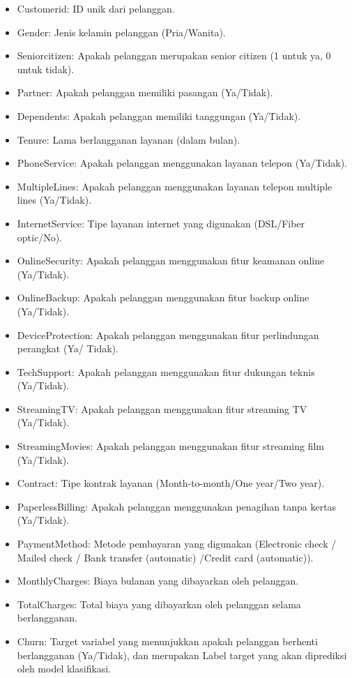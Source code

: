 \begin{itemize}
    \item Customerid: ID unik dari pelanggan.
    \item Gender: Jenis kelamin pelanggan (Pria/Wanita).
    \item Seniorcitizen: Apakah pelanggan merupakan senior citizen (1 untuk ya, 0 untuk tidak).
    \item Partner: Apakah pelanggan memiliki pasangan (Ya/Tidak).
    \item Dependents: Apakah pelanggan memiliki tanggungan (Ya/Tidak).
    \item Tenure: Lama berlangganan layanan (dalam bulan).
    \item PhoneService: Apakah pelanggan menggunakan layanan telepon (Ya/Tidak).
    \item MultipleLines: Apakah pelanggan menggunakan layanan telepon multiple lines (Ya/Tidak).
    \item InternetService: Tipe layanan internet yang digunakan (DSL/Fiber optic/No).
    \item OnlineSecurity: Apakah pelanggan menggunakan fitur keamanan online (Ya/Tidak).
    \item OnlineBackup: Apakah pelanggan menggunakan fitur backup online (Ya/Tidak).
    \item DeviceProtection: Apakah pelanggan menggunakan fitur perlindungan perangkat (Ya/ Tidak).
    \item TechSupport: Apakah pelanggan menggunakan fitur dukungan teknis (Ya/Tidak).
    \item StreamingTV: Apakah pelanggan menggunakan fitur streaming TV (Ya/Tidak).
    \item StreamingMovies: Apakah pelanggan menggunakan fitur streaming film (Ya/Tidak).
    \item Contract: Tipe kontrak layanan (Month-to-month/One year/Two year).
    \item PaperlessBilling: Apakah pelanggan menggunakan penagihan tanpa kertas (Ya/Tidak).
    \item PaymentMethod: Metode pembayaran yang digunakan (Electronic check / Mailed check / Bank transfer (automatic) /Credit card (automatic)).
    \item MonthlyCharges: Biaya bulanan yang dibayarkan oleh pelanggan.
    \item TotalCharges: Total biaya yang dibayarkan oleh pelanggan selama berlangganan.
    \item Churn: Target variabel yang menunjukkan apakah pelanggan berhenti berlangganan (Ya/Tidak), dan merupakan Label target yang akan diprediksi oleh model klasifikasi.
\end{itemize}

